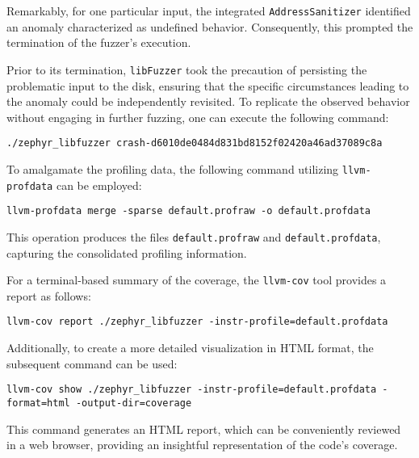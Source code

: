 Remarkably, for one particular input, the integrated \texttt{AddressSanitizer}\cite{GitHubgo55:online}
identified an anomaly characterized as undefined behavior. Consequently, this prompted
the termination of the fuzzer's execution.

Prior to its termination, \texttt{libFuzzer} took the precaution of persisting
the problematic input to the disk, ensuring that the specific circumstances
leading to the anomaly could be independently revisited. To replicate the observed
behavior without engaging in further fuzzing, one can execute the following command:

\begin{verbatim}
./zephyr_libfuzzer crash-d6010de0484d831bd8152f02420a46ad37089c8a
\end{verbatim}

To amalgamate the profiling data, the following command utilizing \texttt{llvm-profdata} can be employed:

\begin{verbatim}
llvm-profdata merge -sparse default.profraw -o default.profdata
\end{verbatim}

This operation produces the files \texttt{default.profraw} and \texttt{default.profdata}, capturing the consolidated profiling information.

For a terminal-based summary of the coverage, the \texttt{llvm-cov} tool provides a report as follows:

\begin{verbatim}
llvm-cov report ./zephyr_libfuzzer -instr-profile=default.profdata
\end{verbatim}

Additionally, to create a more detailed visualization in HTML format, the
subsequent command can be used:

\begin{verbatim}
llvm-cov show ./zephyr_libfuzzer -instr-profile=default.profdata -format=html -output-dir=coverage
\end{verbatim}

This command generates an HTML report, which can be conveniently reviewed in a web browser,
providing an insightful representation of the code's coverage.